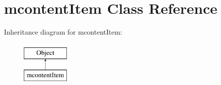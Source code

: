 \hypertarget{classmcontentItem}{}\section{mcontent\+Item Class Reference}
\label{classmcontentItem}
Inheritance diagram for mcontent\+Item\+:\begin{figure}[H]
\begin{center}
\leavevmode
\includegraphics[height=2.000000cm]{classmcontentItem}
\end{center}
\end{figure}
